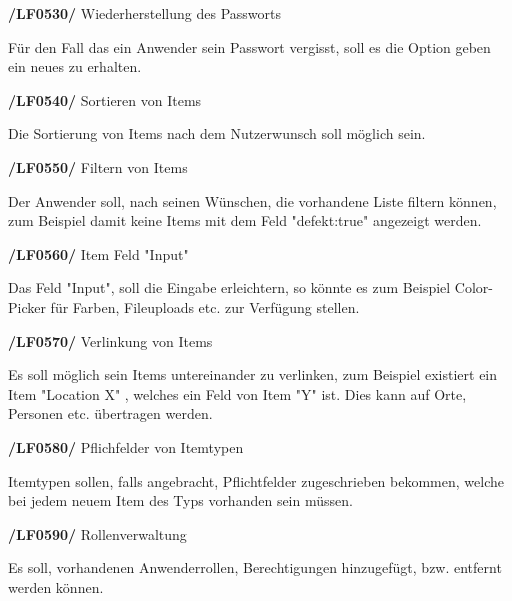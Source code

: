 \documentclass[11pt,a4paper]{report}
\begin{document}
\textbf{/LF0530/} Wiederherstellung des Passworts
\par
\begingroup
\leftskip=1cm
\noindent Für den Fall das ein Anwender sein Passwort vergisst, soll es die Option geben ein neues zu erhalten.\\
\par
\endgroup

\textbf{/LF0540/} Sortieren von Items
\par
\begingroup
\leftskip=1cm
\noindent Die Sortierung von Items nach dem Nutzerwunsch soll möglich sein.\\
\par
\endgroup

\textbf{/LF0550/} Filtern von Items
\par
\begingroup
\leftskip=1cm
\noindent Der Anwender soll, nach seinen Wünschen, die vorhandene Liste filtern können, zum Beispiel damit keine Items mit dem Feld "defekt:true" angezeigt werden.\\
\par
\endgroup

\textbf{/LF0560/} Item Feld "Input"
\par
\begingroup
\leftskip=1cm
\noindent Das Feld "Input", soll die Eingabe erleichtern, so könnte es zum Beispiel Color-Picker für Farben, Fileuploads etc. zur Verfügung stellen.\\
\par
\endgroup

\newpage
\textbf{/LF0570/} Verlinkung von Items
\par
\begingroup
\leftskip=1cm
\noindent Es soll möglich sein Items untereinander zu verlinken, zum Beispiel existiert ein Item "Location X" , welches ein Feld von Item "Y" ist. Dies kann auf Orte, Personen etc. übertragen werden.\\
\par
\endgroup

\textbf{/LF0580/} Pflichfelder von Itemtypen
\par
\begingroup
\leftskip=1cm
\noindent Itemtypen sollen, falls angebracht, Pflichtfelder zugeschrieben bekommen, welche bei jedem neuem Item des Typs vorhanden sein müssen.\\
\par
\endgroup

\textbf{/LF0590/} Rollenverwaltung
\par
\begingroup
\leftskip=1cm
\noindent Es soll, vorhandenen Anwenderrollen, Berechtigungen hinzugefügt, bzw. entfernt werden können.\\
\par
\endgroup
\end{document}
